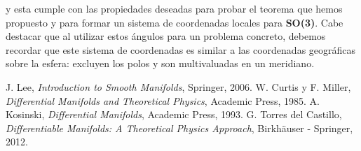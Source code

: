 \documentclass[a4paper,10pt]{article}
\numberwithin{equation}{section}
\begin{document}
y esta cumple con las propiedades deseadas para probar el teorema que hemos propuesto 
y para formar un sistema de coordenadas locales para \textbf{SO(3)}. Cabe destacar 
que al utilizar estos ángulos para un problema concreto, debemos recordar que este 
sistema de coordenadas es similar a las coordenadas geográficas sobre la esfera: excluyen 
los polos y son multivaluadas en un meridiano.


\begin{thebibliography}{10}
J. Lee, \emph{Introduction to Smooth Manifolds}, Springer, 2006.
W. Curtis y F. Miller, \emph{Differential Manifolds and Theoretical Physics}, Academic 
Press, 1985.
A. Kosinski, \emph{Differential Manifolds}, Academic Press, 1993.
G. Torres del Castillo, \emph{Differentiable Manifolds: A Theoretical Physics Approach}, 
Birkhäuser - Springer, 2012.
\end{thebibliography}
\end{document}
